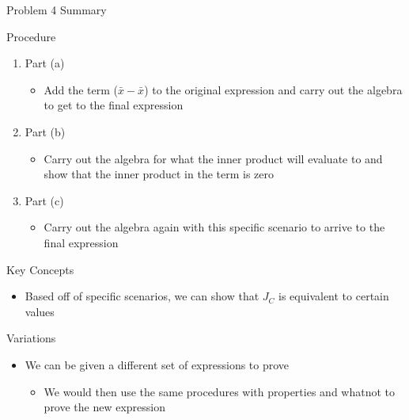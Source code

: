 \begin{summary}{Problem 4 Summary}
    \begin{statement}{Procedure}
        \begin{enumerate}[label = (\alph*)]
            \item Part (a)
            \begin{itemize}
                \item Add the term ($\bar{x} - \bar{x}$) to the original expression and carry out the algebra to get to the final expression
            \end{itemize}
            \item Part (b)
            \begin{itemize}
                \item Carry out the algebra for what the inner product will evaluate to and show that the inner product in the term is zero
            \end{itemize}
            \item Part (c)
            \begin{itemize}
                \item Carry out the algebra again with this specific scenario to arrive to the final expression
            \end{itemize}
        \end{enumerate}
    \end{statement}
    \begin{statement}{Key Concepts}
        \begin{itemize}
            \item Based off of specific scenarios, we can show that $J_{C}$ is equivalent to certain values
        \end{itemize}
    \end{statement}
    \begin{statement}{Variations}
        \begin{itemize}
            \item We can be given a different set of expressions to prove 
            \begin{itemize}
                \item We would then use the same procedures with properties and whatnot to prove the new expression
            \end{itemize}
        \end{itemize}
    \end{statement}
\end{summary}

